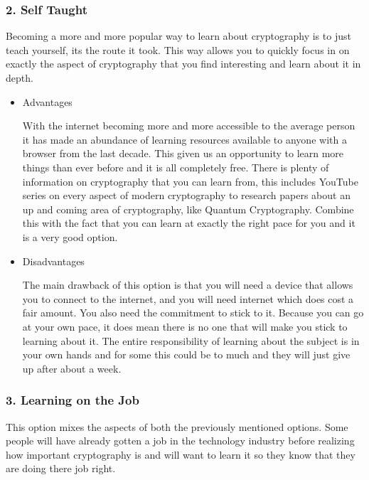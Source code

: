 \subsubsection{2. Self Taught}

Becoming a more and more popular way to learn about cryptography is to just teach yourself, its the route it took. This way allows you to quickly focus in on exactly the aspect of cryptography that you find interesting and learn about it in depth. 

\begin{itemize}
\item{Advantages

With the internet becoming more and more accessible to the average person it has made an abundance of learning resources available to anyone with a browser from the last decade. This given us an opportunity to learn more things than ever before and it is all completely free. There is plenty of information on cryptography that you can learn from, this includes YouTube series on every aspect of modern cryptography to research papers about an up and coming area of cryptography, like Quantum Cryptography. Combine this with the fact that you can learn at exactly the right pace for you and it is a very good option.
}

\item{Disadvantages

The main drawback of this option is that you will need a device that allows you to connect to the internet, and you will need internet which does cost a fair amount. You also need the commitment to stick to it. Because you can go at your own pace, it does mean there is no one that will make you stick to learning about it. The entire responsibility of learning about the subject is in your own hands and for some this could be to much and they will just give up after about a week. 
}
\end{itemize}

\subsubsection{3. Learning on the Job}

This option mixes the aspects of both the previously mentioned options. Some people will have already gotten a job in the technology industry before realizing how important cryptography is and will want to learn it so they know that they are doing there job right.

